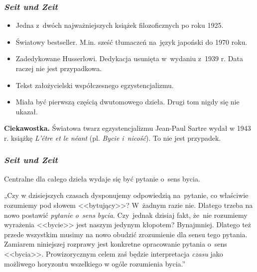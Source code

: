 \documentclass[10pt,t]{beamer}
\begin{document}
\begin{frame}
  \frametitle{\textit{Seit und Zeit}}


  \begin{itemize}

  \item Jedna z~dwóch najważniejszych książek filozoficznych po
    roku 1925.

  \item Światowy bestseller. M.in. sześć tłumaczeń na~język
    japoński do 1970 roku.

  \item Zadedykowane Husserlowi. Dedykacja usunięta w~wydaniu
    z~1939 r. Data raczej nie jest przypadkowa.

  \item Tekst założycielski współczesnego egzystencjalizmu.

  \item Miała być pierwszą częścią dwutomowego dzieła. Drugi tom
    nigdy się nie ukazał.

  \end{itemize}

  \textbf{Ciekawostka.} Światowa twarz egzystencjalizmu Jean-Paul Sartre
  wydał w 1943 r. książkę \textit{L'étre et le néant} (pl. \textit{Bycie
    i~nicość}). To nie jest przypadek.

\end{frame}





\begin{frame}
  \frametitle{\textit{Seit und Zeit}}


  Centralne dla całego dzieła wydaje się być pytanie o~sens bycia.

  „Czy w dzisiejszych czasach dysponujemy odpowiedzią na~pytanie,
  co właściwie rozumiemy pod słowem <<bytujący>>? W~żadnym razie
  nie. Dlatego trzeba na nowo postawić \textit{pytanie o~sens
    bycia}. Czy~jednak dzisiaj fakt, że~nie rozumiemy wyrażenia
  <<bycie>> jest naszym jedynym kłopotem? Bynajmniej. Dlatego też
  przede wszystkim musimy na nowo obudzić zrozumienie dla sensu
  tego pytania. Zamiarem niniejszej rozprawy jest konkretne
  opracowanie pytania o~sens <<bycia>>. Prowizorycznym celem zaś
  będzie interpretacja \textit{czasu} jako możliwego horyzontu
  wszelkiego w ogóle rozumienia bycia.”

\end{frame}
\end{document}
